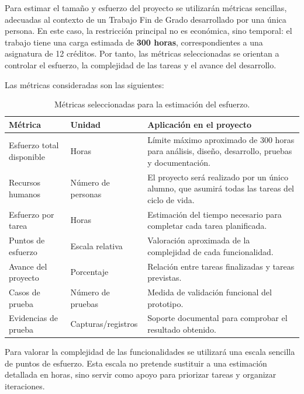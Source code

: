 Para estimar el tamaño y esfuerzo del proyecto se utilizarán métricas sencillas, adecuadas al contexto de un Trabajo Fin de Grado desarrollado por una única persona. En este caso, la restricción principal no es económica, sino temporal: el trabajo tiene una carga estimada de \textbf{300 horas}, correspondientes a una asignatura de 12 créditos. Por tanto, las métricas seleccionadas se orientan a controlar el esfuerzo, la complejidad de las tareas y el avance del desarrollo.

Las métricas consideradas son las siguientes:

\begin{table}[h!]
\centering
\small
\begin{tabular}{|p{4cm}|p{3.5cm}|p{7cm}|}
\hline
\textbf{Métrica} & \textbf{Unidad} & \textbf{Aplicación en el proyecto} \\ \hline
Esfuerzo total disponible & Horas & Límite máximo aproximado de 300 horas para análisis, diseño, desarrollo, pruebas y documentación. \\ \hline
Recursos humanos & Número de personas & El proyecto será realizado por un único alumno, que asumirá todas las tareas del ciclo de vida. \\ \hline
Esfuerzo por tarea & Horas & Estimación del tiempo necesario para completar cada tarea planificada. \\ \hline
Puntos de esfuerzo & Escala relativa & Valoración aproximada de la complejidad de cada funcionalidad. \\ \hline
Avance del proyecto & Porcentaje & Relación entre tareas finalizadas y tareas previstas. \\ \hline
Casos de prueba & Número de pruebas & Medida de validación funcional del prototipo. \\ \hline
Evidencias de prueba & Capturas/registros & Soporte documental para comprobar el resultado obtenido. \\ \hline
\end{tabular}
\caption{Métricas seleccionadas para la estimación del esfuerzo.}
\label{tab:metricas}
\end{table}

Para valorar la complejidad de las funcionalidades se utilizará una escala sencilla de puntos de esfuerzo. Esta escala no pretende sustituir a una estimación detallada en horas, sino servir como apoyo para priorizar tareas y organizar iteraciones.

